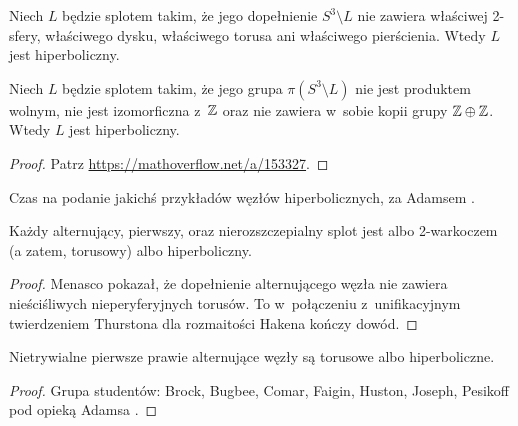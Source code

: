\begin{proposition}
    Niech $L$ będzie splotem takim, że jego dopełnienie $S^3 \setminus L$ nie zawiera właściwej 2-sfery, właściwego dysku, właściwego torusa ani właściwego pierścienia.
    Wtedy $L$ jest hiperboliczny.
\end{proposition}

\begin{proposition}
    Niech $L$ będzie splotem takim, że jego grupa $\pi(S^3 \setminus L)$ nie jest produktem wolnym, nie jest izomorficzna z~$\mathbb Z$ oraz nie zawiera w~sobie kopii grupy $\mathbb Z \oplus \mathbb Z$.
    Wtedy $L$ jest hiperboliczny.
\end{proposition}

\begin{proof}
    Patrz \url{https://mathoverflow.net/a/153327}.
\end{proof}

Czas na podanie jakichś przykładów węzłów hiperbolicznych, za Adamsem \cite{adams05}.

\begin{proposition}
    Każdy alternujący, pierwszy, oraz nierozszczepialny splot jest albo 2-warkoczem (a zatem, torusowy) albo hiperboliczny.
%
%
%
\end{proposition}

\begin{proof}
    Menasco \cite{menasco84} pokazał, że dopełnienie alternującego węzła nie zawiera nieściśliwych nieperyferyjnych torusów.
%
    To w~połączeniu z~unifikacyjnym twierdzeniem Thurstona dla rozmaitości Hakena kończy dowód.
%
\end{proof}

\begin{proposition}
    Nietrywialne pierwsze prawie alternujące węzły są torusowe albo hiperboliczne.
%
%
\end{proposition}

\begin{proof}
    Grupa studentów: Brock, Bugbee, Comar, Faigin, Huston, Joseph, Pesikoff pod opieką Adamsa \cite{brock92}.
%
%
%
%
%
%
%
%
\end{proof}

